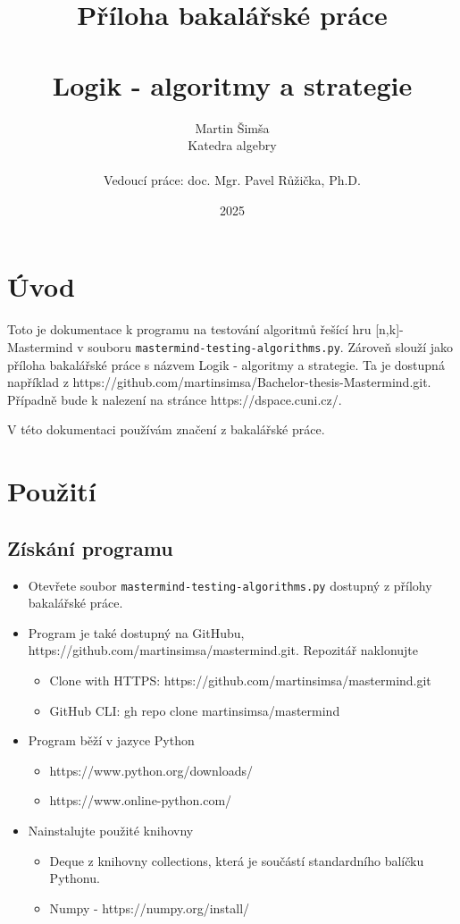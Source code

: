 \documentclass[12pt,a4paper]{article}
\begin{document}
\title{Příloha bakalářské práce\\
\\
Logik - algoritmy a strategie}
\author{
Martin Šimša\\
Katedra algebry\\
\\
Vedoucí práce: doc. Mgr. Pavel Růžička, Ph.D.
}
\date{2025}

\maketitle
\section{Úvod}
Toto je dokumentace k programu na testování algoritmů řešící hru [n,k]-Mastermind v souboru \texttt{mastermind-testing-algorithms.py}. Zároveň slouží jako příloha bakalářské práce s názvem Logik - algoritmy a strategie. Ta je dostupná například z https://github.com/martinsimsa/Bachelor-thesis-Mastermind.git. Případně bude k nalezení na stránce https://dspace.cuni.cz/.

V této dokumentaci používám značení z bakalářské práce.

\section{Použití}

\subsection{Získání programu}
\begin{itemize}
    \item Otevřete soubor \texttt{mastermind-testing-algorithms.py} dostupný z přílohy bakalářské práce.
    \item Program je také dostupný na GitHubu, https://github.com/martinsimsa/mastermind.git. Repozitář naklonujte
    \begin{itemize}
        \item Clone with HTTPS:
        https://github.com/martinsimsa/mastermind.git
        \item GitHub CLI:
        gh repo clone martinsimsa/mastermind    \end{itemize}
    \item Program běží v jazyce Python
    \begin{itemize}
        \item https://www.python.org/downloads/
        \item https://www.online-python.com/
    \end{itemize}
    \item Nainstalujte použité knihovny
    \begin{itemize}
        \item Deque z knihovny collections, která je součástí standardního balíčku Pythonu.
        \item Numpy - https://numpy.org/install/
    \end{itemize}
\end{itemize}
\end{document}
